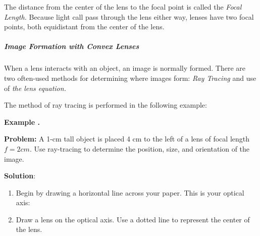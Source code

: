 The distance from the center of the lens to the focal point is called the \textit{Focal Length.}   Because light call pass through the lens either way, lenses have two focal points, both equidistant from the center of the lens.  

\subparagraph{Image Formation with Convex Lenses}
When a lens interacts with an object, an image is normally formed.  There are two often-used methods for determining where images form: \textit{Ray Tracing} and use of \textit{the lens equation.}

The method of ray tracing is performed in the following example: 

\begin{mdframed}[backgroundcolor=blue!10!white]
	\begin{center}	
		\textbf{Example \thesection.}	
	\end{center}
	
	\textbf{Problem:} A 1-cm tall object is placed 4 cm to the left of a lens of focal length $f=2 \si{cm}$.  Use ray-tracing to determine the position, size, and orientation of the image.  

\textbf{Solution}: 


\begin{enumerate}
	\item Begin by drawing a horizontal line across your paper.  This is your optical axis: 
	\vspace{.5 in}
	\begin{center}
		

		\end{center}
	\vspace{.5 in}
	
	
	
	\item Draw a lens on the optical axis.  Use a dotted line to represent the center of the lens.  
	

	\begin{center}
		
		
\end{center}
\end{enumerate}
\end{mdframed}
